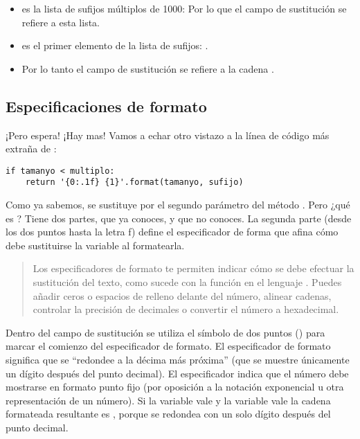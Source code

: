 \begin{itemize}
\item {} es la lista de sufijos múltiplos de 1000: \codigo{['KB', 'MB', 'GB', 'TB', 'PB', 'EB', 'ZB', 'YB']} Por lo que el campo de sustitución  se refiere a esta lista.

\item {} es el primer elemento de la lista de sufijos: \codigo{['KB']}. 

\item Por lo tanto el campo de sustitución  se refiere a la cadena .

\end{itemize}

\subsection{Especificaciones de formato}

¡Pero espera! ¡Hay mas! Vamos a echar otro vistazo a la línea de código más extraña de :

\noindent\begin{minipage}{\textwidth}
\begin{lstlisting}[mathescape=True]
if tamanyo < multiplo:
    return '{0:.1f} {1}'.format(tamanyo, sufijo)
\end{lstlisting}
\end{minipage}

Como ya sabemos,  se sustituye por el segundo parámetro  del método . Pero ¿qué es ? Tiene dos partes,  que ya conoces, y  que no conoces. La segunda parte (desde los dos puntos hasta la letra f) define el especificador de forma que afina cómo debe sustituirse la variable al formatearla.

\begin{quote}
Los especificadores de formato te permiten indicar cómo se debe efectuar la sustitución del texto, como sucede con la función  en el lenguaje . Puedes añadir ceros o espacios de relleno delante del número, alinear cadenas, controlar la precisión de decimales o convertir el número a hexadecimal.
\end{quote}

Dentro del campo de sustitución se utiliza el símbolo de dos puntos (\codigo{:}) para marcar el comienzo del especificador de formato. El especificador de formato  significa que se ``redondee a la décima más próxima'' (que se muestre únicamente un dígito después del punto decimal). El especificador  indica que el número debe mostrarse en formato punto fijo (por oposición a la notación exponencial u otra representación de un número). Si la variable  vale  y la variable  vale  la cadena formateada resultante es , porque  se redondea con un solo dígito después del punto decimal.

